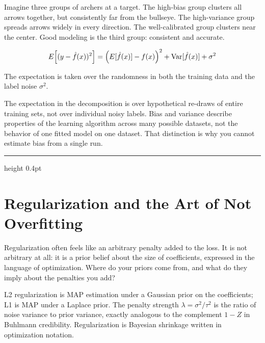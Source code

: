 \documentclass[12pt,a4paper]{article}
\begin{document}
\begin{analogy}
Imagine three groups of archers at a target. The high-bias group clusters
all arrows together, but consistently far from the bullseye. The
high-variance group spreads arrows widely in every direction. The
well-calibrated group clusters near the center. Good modeling is the
third group: consistent and accurate.
\end{analogy}

\begin{equation*}
  E\!\left[(y - \hat{f}(x))^2\right]
  = \Bigl(E[\hat{f}(x)] - f(x)\Bigr)^2
    + \mathrm{Var}[\hat{f}(x)]
    + \sigma^2
\end{equation*}

The expectation is taken over the randomness in both the training data
and the label noise $\sigma^2$.

\begin{mentalmodel}
The expectation in the decomposition is over hypothetical re-draws of
entire training sets, not over individual noisy labels. Bias and variance
describe properties of the learning algorithm across many possible
datasets, not the behavior of one fitted model on one dataset. That
distinction is why you cannot estimate bias from a single run.
\end{mentalmodel}

\vspace{10pt}\hrule height 0.4pt\vspace{14pt}

\section*{Regularization and the Art of Not Overfitting}

Regularization often feels like an arbitrary penalty added to the loss.
It is not arbitrary at all: it is a prior belief about the size of
coefficients, expressed in the language of optimization. Where do your
priors come from, and what do they imply about the penalties you add?

\begin{concept}
L2 regularization is MAP estimation under a Gaussian prior on the
coefficients; L1 is MAP under a Laplace prior. The penalty strength
$\lambda = \sigma^2/\tau^2$ is the ratio of noise variance to prior
variance, exactly analogous to the complement $1-Z$ in Buhlmann
credibility. Regularization is Bayesian shrinkage written in
optimization notation.
\end{concept}
\end{document}
